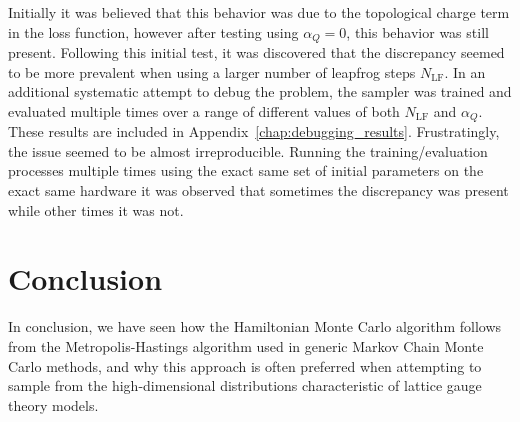 \documentclass[../main.tex]{subfiles}
\begin{document}
Initially it was believed that this behavior was due to the topological charge
term in the loss function, however after testing using $\alpha_{Q} = 0$, this
behavior was still present.
%
Following this initial test, it was discovered that the discrepancy seemed to
be more prevalent when using a larger number of leapfrog steps
$N_{\mathrm{LF}}$.
%
In an additional systematic attempt to debug the problem, the sampler was
trained and evaluated multiple times over a range of different values of both
$N_{\mathrm{LF}}$ and $\alpha_{Q}$.
%
These results are included in Appendix~\ref{chap:debugging_results}.
%
Frustratingly, the issue seemed to be almost irreproducible.
%
Running the training/evaluation processes multiple times using the exact same
set of initial parameters on the exact same hardware it was observed that
sometimes the discrepancy was present while other times it was not.

\section{Conclusion}%
\label{sec:l2hmc_conclusion}
In conclusion, we have seen how the Hamiltonian Monte Carlo algorithm follows
from the Metropolis-Hastings algorithm used in generic Markov Chain Monte Carlo
methods, and why this approach is often preferred when attempting to sample
from the high-dimensional distributions characteristic of lattice gauge theory
models.
\end{document}

